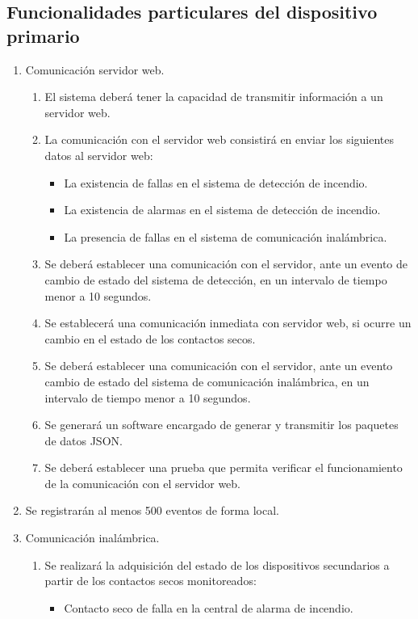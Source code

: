 \subsection{Funcionalidades particulares del dispositivo primario}
	\begin{enumerate}
	\item Comunicación servidor web.
		\begin{enumerate}
		\item El sistema deberá tener la capacidad de transmitir información a un servidor web.
		\item La comunicación con el servidor web consistirá en enviar los siguientes datos al servidor web:
			\begin{itemize}
				\item La existencia de fallas en el sistema de detección de incendio. 	
				\item La existencia de alarmas en el sistema de detección de incendio.
				\item La presencia de fallas en el sistema de comunicación inalámbrica.
			\end{itemize}
		\item Se deberá establecer una comunicación con el servidor, ante un evento de cambio de estado del sistema de detección, en un intervalo de tiempo menor a 10 segundos.
		\item Se establecerá una comunicación inmediata con servidor web, si ocurre un cambio en el estado de los contactos secos.
		\item Se deberá establecer una comunicación con el servidor, ante un evento cambio de estado del sistema de comunicación inalámbrica, en un intervalo de tiempo menor a 10 segundos.
		\item Se generará un software encargado de generar y transmitir los paquetes de datos JSON.
		\item Se deberá establecer una prueba que permita verificar el funcionamiento de la comunicación con el servidor web. 
		\end{enumerate}
	\item Se registrarán al menos 500 eventos de forma local.
	\item Comunicación inalámbrica.
		\begin{enumerate}		
		\item Se realizará la adquisición del estado de los dispositivos secundarios a partir de los contactos secos monitoreados:
			\begin{itemize}
				\item Contacto seco de falla en la central de alarma de incendio.

\end{itemize}
\end{enumerate}
\end{enumerate}

